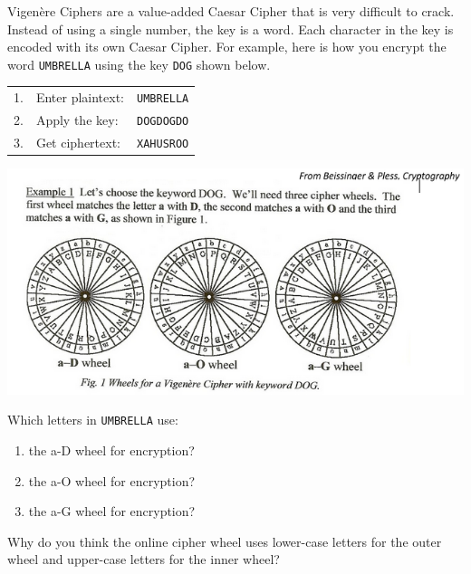 

Vigenère Ciphers are a value-added Caesar Cipher that is very difficult to crack.
Instead of using a single number, the key is a word.
Each character in the key is encoded with its own Caesar Cipher.
For example, here is how you encrypt the word \texttt{UMBRELLA} using the key \texttt{DOG} shown below.

\begin{table}[h!]
\centering
\begin{tabular}{lll}
1. & Enter plaintext: & \texttt{UMBRELLA} \\[1ex]
2. & Apply the key:   & \texttt{DOGDOGDO} \\[1ex]
3. & Get ciphertext:  & \texttt{XAHUSROO}
\end{tabular}
\end{table}
\vspace{-1em}
\begin{center}
\includegraphics[width=0.9\linewidth]{vigenere1.png}
\end{center}



\Q Which letters in \texttt{UMBRELLA} use:

\begin{enumerate}

\item the a-D wheel for encryption? 

\item the a-O wheel for encryption? 

\item the a-G wheel for encryption? 

\end{enumerate}


\Q Why do you think the online cipher wheel uses lower-case letters for the outer wheel and upper-case letters for the inner wheel?

